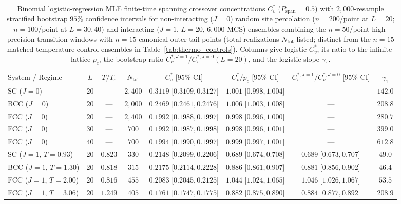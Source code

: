 \documentclass[aps,pre,reprint,superscriptaddress,amsmath,amssymb,floatfix]{revtex4-2}
\begin{document}
\begin{table}[t]
\caption{\label{tab:spanning}Binomial logistic-regression MLE finite-time spanning crossover concentrations $C_v^*$ ($P_{\mathrm{span}} = 0.5$) with $2{,}000$-resample stratified bootstrap $95\%$ confidence intervals for non-interacting ($J = 0$) random site percolation ($n = 200$/point at $L = 20$; $n = 100$/point at $L = 30, 40$) and interacting ($J = 1$, $L = 20$, $6{,}000$ MCS) ensembles combining the $n = 50$/point high-precision transition windows with $n = 15$ canonical outer-tail points (total realizations $N_{\mathrm{tot}}$ listed; distinct from the $n = 15$ matched-temperature control ensembles in Table~\ref{tab:thermo_controls}). Columns give logistic $C_v^*$, its ratio to the infinite-lattice $p_c$, the bootstrap ratio $C_v^{*,J=1}/C_v^{*,J=0}(L=20)$, and the logistic slope $\gamma_1$.}
\begingroup
\footnotesize
\setlength{\tabcolsep}{4pt}
\begin{ruledtabular}
\begin{tabular}{lccccccc}
System / Regime & $L$ & $T/T_c$ & $N_{\mathrm{tot}}$ & $C_v^*$ [$95\%$ CI] & $C_v^*/p_c$ [$95\%$ CI] & $C_v^{*,J=1}/C_v^{*,J=0}$ [$95\%$ CI] & $\gamma_1$ \\
\colrule
SC ($J=0$)  & $20$ & --- & $2{,}400$ & $0.3119$ [$0.3109,0.3127$] & $1.001$ [$0.998,1.004$] & --- & $142.0$ \\
BCC ($J=0$) & $20$ & --- & $2{,}000$ & $0.2469$ [$0.2461,0.2476$] & $1.006$ [$1.003,1.008$] & --- & $208.8$ \\
FCC ($J=0$) & $20$ & --- & $2{,}400$ & $0.1992$ [$0.1988,0.1997$] & $0.998$ [$0.996,1.000$] & --- & $280.7$ \\
FCC ($J=0$) & $30$ & --- & $700$     & $0.1992$ [$0.1987,0.1998$] & $0.998$ [$0.996,1.001$] & --- & $399.0$ \\
FCC ($J=0$) & $40$ & --- & $700$     & $0.1994$ [$0.1990,0.1997$] & $0.999$ [$0.997,1.001$] & --- & $612.8$ \\
\colrule
SC ($J=1$, $T=0.93$)  & $20$ & $0.823$ & $330$ & $0.2148$ [$0.2099,0.2206$] & $0.689$ [$0.674,0.708$] & $0.689$ [$0.673,0.707$] & $49.0$ \\
BCC ($J=1$, $T=1.30$) & $20$ & $0.818$ & $315$ & $0.2175$ [$0.2114,0.2228$] & $0.886$ [$0.861,0.907$] & $0.881$ [$0.856,0.902$] & $46.4$ \\
FCC ($J=1$, $T=2.00$) & $20$ & $0.816$ & $455$ & $0.2083$ [$0.2045,0.2125$] & $1.044$ [$1.024,1.065$] & $1.046$ [$1.026,1.067$] & $53.5$ \\
FCC ($J=1$, $T=3.06$) & $20$ & $1.249$ & $405$ & $0.1761$ [$0.1747,0.1775$] & $0.882$ [$0.875,0.890$] & $0.884$ [$0.877,0.892$] & $208.9$ \\
\end{tabular}
\end{ruledtabular}
\endgroup
\end{table}
\end{document}
